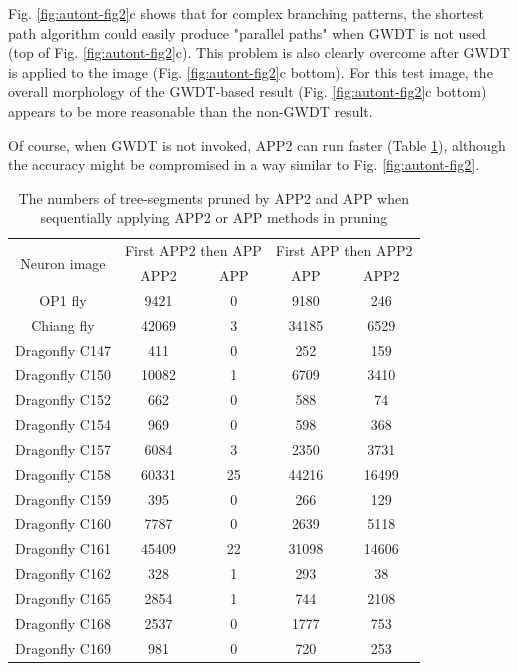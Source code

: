 Fig. \ref{fig:autont-fig2}c shows that for complex branching patterns, the shortest path algorithm could easily produce "parallel paths" when GWDT is not used (top of Fig. \ref{fig:autont-fig2}c). This problem is also clearly overcome after GWDT is applied to the image (Fig. \ref{fig:autont-fig2}c bottom). For this test image, the overall morphology of the GWDT-based result (Fig. \ref{fig:autont-fig2}c bottom) appears to be more reasonable than the non-GWDT result.

Of course, when GWDT is not invoked, APP2 can run faster (Table \ref{tab:autont-tab1}), although the accuracy might be compromised in a way similar to Fig. \ref{fig:autont-fig2}.

\begin{table} \label{tab:autont-tab1}
  \caption{The numbers of tree-segments pruned by APP2 and APP when sequentially applying APP2 or APP methods in pruning}
\begin{center}
 \begin{tabular}{ccccc}
    \hline
	\multirow{2}{*}{Neuron image} &\multicolumn{2}{c}{First APP2 then APP} & \multicolumn{2}{c}{First APP then APP2}\\ \cline{2-5}
	 &APP2 & APP & APP & APP2\\ \hline
	OP1 fly & 9421& 0 & 9180& 246 \\ \hline
Chiang fly	& 42069	& 3 &	34185 &	6529\\ \hline
Dragonfly C147 &	411	& 0	& 252 &	159\\ \hline
Dragonfly C150 &	10082 &	1 &	6709 &	3410\\ \hline
Dragonfly C152 &	662	& 0 & 	588 &	74\\ \hline
Dragonfly C154 &	969	& 0	& 598	& 368\\ \hline
Dragonfly C157 &	6084 &	3	& 2350 &	3731\\ \hline
Dragonfly C158 &	60331 &	25 &	44216 &	16499\\ \hline
Dragonfly C159 &	395	& 0	& 266 &	129\\ \hline
Dragonfly C160 &	7787 &	0	& 2639 &	5118\\ \hline
Dragonfly C161 &	45409 &	22 &	31098 &	14606\\ \hline
Dragonfly C162 &	328	& 1	& 293 &	38\\ \hline
Dragonfly C165 &	2854 &	1 & 	744 &	2108\\ \hline
Dragonfly C168 &	2537 &	0 &	1777 &	753\\ \hline
Dragonfly C169 &	981	& 0	& 720 &	253\\ \hline

\end{tabular}
\end{center}
\end{table}
